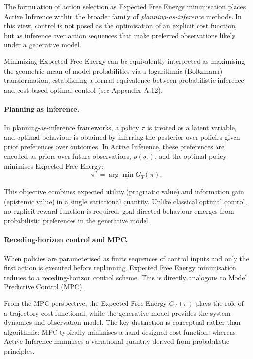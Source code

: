 \documentclass[a4paper, twoside]{article}
\begin{document}
The formulation of action selection as Expected Free Energy minimisation places
Active Inference within the broader family of \emph{planning-as-inference}
methods. In this view, control is not posed as the optimisation of an explicit
cost function, but as inference over action sequences that make preferred
observations likely under a generative model.

Minimizing Expected Free Energy can be equivalently interpreted as maximising the geometric mean of model probabilities via a logarithmic (Boltzmann) transformation, establishing a formal equivalence between probabilistic inference and cost-based optimal control (see Appendix~A.12).


\paragraph{Planning as inference.}
In planning-as-inference frameworks, a policy $\pi$ is treated as a latent
variable, and optimal behaviour is obtained by inferring the posterior over
policies given prior preferences over outcomes. In Active Inference, these
preferences are encoded as priors over future observations, $p(o_\tau)$, and the
optimal policy minimises Expected Free Energy:
\[
\pi^\ast = \arg\min_\pi G_T(\pi).
\]

This objective combines expected utility (pragmatic value) and information gain
(epistemic value) in a single variational quantity. Unlike classical optimal
control, no explicit reward function is required; goal-directed behaviour
emerges from probabilistic preferences in the generative model.

\paragraph{Receding-horizon control and MPC.}
When policies are parameterised as finite sequences of control inputs and only
the first action is executed before replanning, Expected Free Energy minimisation
reduces to a receding-horizon control scheme. This is directly analogous to Model
Predictive Control (MPC).

From the MPC perspective, the Expected Free Energy $G_T(\pi)$ plays the role of a
trajectory cost functional, while the generative model provides the system
dynamics and observation model. The key distinction is conceptual rather than
algorithmic: MPC typically minimises a hand-designed cost function, whereas
Active Inference minimises a variational quantity derived from probabilistic
principles.
\end{document}
